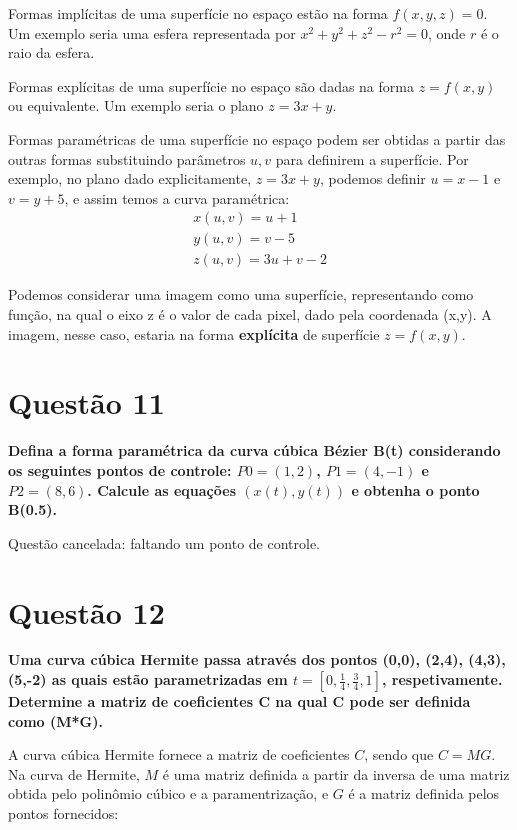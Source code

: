 \documentclass[12pt]{article}
\begin{document}
Formas implícitas de uma superfície no espaço estão na forma $f(x,y,z) = 0$. Um exemplo seria uma esfera representada por $x^2 + y^2 + z^2 - r^2 = 0$, onde $r$ é o raio da esfera.

Formas explícitas de uma superfície no espaço são dadas na forma $z = f(x,y)$ ou equivalente. Um exemplo seria o plano $z = 3x+y$.

Formas paramétricas de uma superfície no espaço podem ser obtidas a partir das outras formas substituindo parâmetros $u,v$ para definirem a superfície. Por exemplo, no plano dado explicitamente, $z=3x+y$, podemos definir $u=x-1$ e $v=y+5$, e assim temos a curva paramétrica:
\begin{gather*}
    x(u,v) = u+1\\
    y(u,v) = v-5\\
    z(u,v) = 3u+v-2
\end{gather*}

Podemos considerar uma imagem como uma superfície, representando como função, na qual o eixo z é o valor de cada pixel, dado pela coordenada (x,y). A imagem, nesse caso, estaria na forma \textbf{explícita} de superfície $z = f(x,y)$.

\section*{Questão 11}
{\bfseries Defina a forma paramétrica da curva cúbica Bézier B(t) considerando os seguintes pontos de controle: $P0 = (1, 2)$, $P1 = (4, -1)$ e $P2 = (8, 6)$. Calcule as equações $(x(t), y(t))$ e obtenha o ponto B(0.5).}

Questão cancelada: faltando um ponto de controle.

\section*{Questão 12}
{\bfseries Uma curva cúbica Hermite passa através dos pontos (0,0), (2,4), (4,3), (5,-2) as quais estão parametrizadas em $t=[0,\frac{1}{4},\frac{3}{4},1]$, respetivamente. Determine a matriz de coeficientes C na qual C pode ser definida como (M*G).}

A curva cúbica Hermite fornece a matriz de coeficientes $C$, sendo que $C=MG$. Na curva de Hermite, $M$ é uma matriz definida a partir da inversa de uma matriz obtida pelo polinômio cúbico e a paramentrização, e $G$ é a matriz definida pelos pontos fornecidos:
\end{document}
